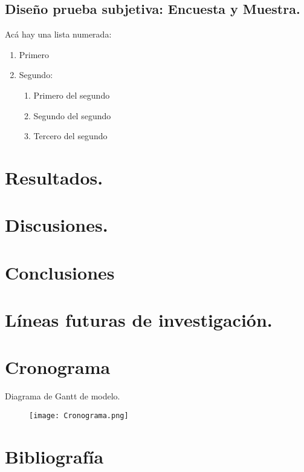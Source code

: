 \subsection{Diseño prueba subjetiva: Encuesta y Muestra.}
Acá hay una lista numerada:
\begin{enumerate}
	\item Primero
	\item Segundo:
	\begin{enumerate}
		\item Primero del segundo
		\item Segundo del segundo
		\item Tercero del segundo
	\end{enumerate}
\end{enumerate}

\section{Resultados.}

\section{Discusiones.}

\section{Conclusiones}

\section{Líneas futuras de investigación.}

\section{Cronograma} %
Diagrama de Gantt de modelo.
\begin{figure}[h]
	\centering
	\texttt{[image: Cronograma.png]}
	\label{fig:Cronograma}
\end{figure}

\newpage
\section{Bibliografía}
\printbibliography[heading=none]

